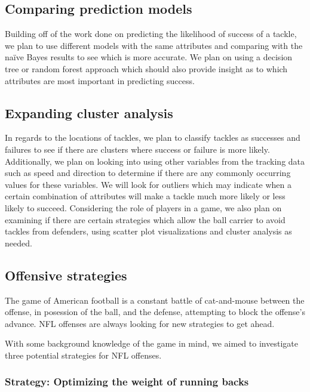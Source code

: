 \documentclass[bibtex, sigconf, hyperref={colorlinks=true,linkcolor=blue,urlcolor=blue}]{acmart}
\begin{document}
\subsection{Comparing prediction models}


Building off of the work done on predicting the likelihood of success of a
tackle, we plan to use different models with the same attributes and comparing
with the na\"ive Bayes results to see which is more accurate.  We plan on using
a decision tree or random forest approach which should also provide insight as
to which attributes are most important in predicting success.

\subsection{Expanding cluster analysis}


In regards to the locations of tackles, we plan to classify tackles as successes
and failures to see if there are clusters where success or failure is more
likely. Additionally, we plan on looking into using other variables from the
tracking data such as speed and direction to determine if there are any commonly
occurring values for these variables. We will look for outliers which may
indicate when a certain combination of attributes will make a tackle much more
likely or less likely to succeed. Considering the role of players in a game, we
also plan on examining if there are certain strategies which allow the ball
carrier to avoid tackles from defenders, using scatter plot visualizations and
cluster analysis as needed.

\subsection{Offensive strategies}

The game of American football is a constant battle of cat-and-mouse between the
offense, in posession of the ball, and the defense, attempting to block the
offense's advance. NFL offenses are always looking for new strategies to get
ahead.

With some background knowledge of the game in mind, we aimed to investigate
three potential strategies for NFL offenses.

\subsubsection{Strategy: Optimizing the weight of running backs}
\end{document}

